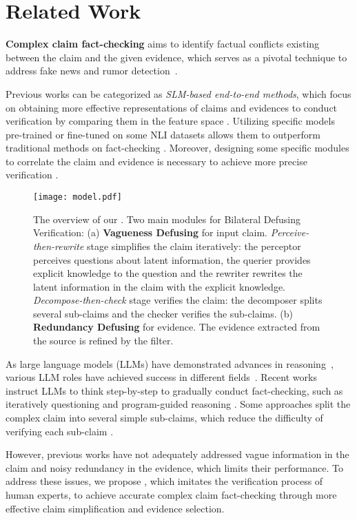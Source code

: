 \section{Related Work}
\textbf{Complex claim fact-checking} aims to identify factual conflicts existing between the claim and the given evidence, which serves as a pivotal technique to address fake news and rumor detection~\cite{liu2024skepticism}.

Previous works can be categorized as \textit{SLM-based end-to-end methods}, which focus on obtaining more effective representations of claims and evidences to conduct verification by comparing them in the feature space \cite{popat2018declare, ma2019sentence}. 
Utilizing specific models pre-trained or fine-tuned on some NLI datasets allows them to outperform traditional methods on fact-checking \cite{kruengkrai2021multi, he2022debertav3, wadden2022multivers}. Moreover, designing some specific modules to correlate the claim and evidence is necessary to achieve more precise verification \cite{xu2022evidence, liao2023muser}. 

\begin{figure*}
\centering
\texttt{[image: model.pdf]}
\caption{The overview of our \model. Two main modules for Bilateral Defusing Verification: (a) \textbf{Vagueness Defusing} for input claim. \textit{Perceive-then-rewrite} stage simplifies the claim iteratively: the perceptor perceives questions about latent information, the querier provides explicit knowledge to the question and the rewriter rewrites the latent information in the claim with the explicit knowledge. \textit{Decompose-then-check} stage verifies the claim: the decomposer splits several sub-claims and the checker verifies the sub-claims. (b) \textbf{Redundancy Defusing} for evidence. The evidence extracted from the source is refined by the filter.}
\label{fig:model}
\end{figure*}

As large language models (LLMs) have demonstrated advances in reasoning~\cite{wei2022chain,wang2022self,sun2024determlr}, various LLM roles have achieved success in different fields~\cite{sun2024harnessing,sun2024facilitating,liu2025mobile}.
Recent works instruct LLMs to think step-by-step to gradually conduct fact-checking, such as iteratively questioning \cite{press2022measuring} and program-guided reasoning \cite{pan2023factchecking}. Some approaches split the complex claim into several simple sub-claims, which reduce the difficulty of verifying each sub-claim \cite{zhang2023llmbased, wang2023explainable}.

However, previous works have not adequately addressed vague information in the claim and noisy redundancy in the evidence, which limits their performance. To address these issues, we propose \model, which imitates the verification process of human experts, to achieve accurate complex claim fact-checking through more effective claim simplification and evidence selection.